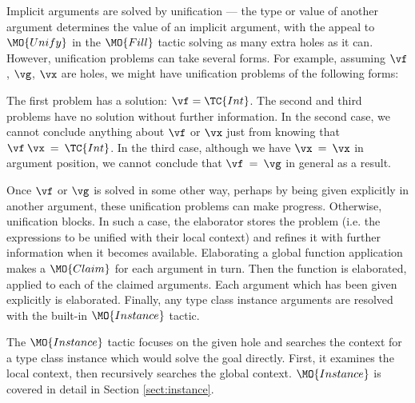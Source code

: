 Implicit arguments are solved by unification
--- the type or value of another argument determines the value of an implicit argument,
with the appeal to $\MO{Unify}$ in the $\MO{Fill}$ tactic solving as many extra holes
as it can. However, unification problems can take several forms. For example, assuming
$\vf$, $\vg$, $\vx$ are holes, we might have unification problems of the following
forms:


The first problem has a solution: $\vf=\TC{Int}$. The second and third problems
have no solution without further information. In the second case, we cannot
conclude anything about $\vf$ or $\vx$ just from knowing that
$\vf\:\vx\:=\:\TC{Int}$.  In the third case, although we have $\vx\:=\:\vx$ in
argument position, we cannot conclude that $\vf\:=\:\vg$ in general as a
result.

Once $\vf$ or $\vg$ is solved in some other way, perhaps by being given
explicitly in another argument, these unification problems can make progress.
Otherwise, unification blocks.  In such a case, the elaborator stores the
problem (i.e. the expressions to be unified with their local context) and
refines it with further information when it becomes available. 
Elaborating a global function application makes a $\MO{Claim}$ for each
argument in turn. Then the function is elaborated, applied to each of the
claimed arguments. Each argument which has been given explicitly is
elaborated. 
Finally, any type class instance arguments are resolved with the
built-in $\MO{Instance}$ tactic.


The $\MO{Instance}$ tactic focuses on the given hole and searches the context for
a type class instance which would solve the goal directly. First, it examines the local
context, then recursively searches the global context. $\MO{Instance}$ is covered
in detail in Section \ref{sect:instance}.

